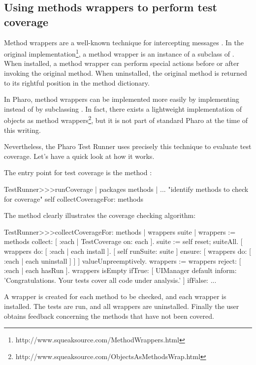 \documentclass[a4paper,10pt,twoside]{book}
\begin{document}
\subsection{Using methods wrappers to perform test coverage}

Method wrappers are a well-known technique for intercepting messages \cite{Bran98a}.
In the original implementation\footnote{http://www.squeaksource.com/MethodWrappers.html}, a method wrapper is an instance of a subclass of . When installed, a method wrapper can perform special actions before or after invoking the original method.
When uninstalled, the original method is returned to its rightful position in the method dictionary.

In Pharo, method wrappers can be implemented more easily by implementing  instead of by subclassing . In fact, there exists a lightweight implementation of objects as method wrappers\footnote{http://www.squeaksource.com/ObjectsAsMethodsWrap.html}, but it is not part of standard Pharo at the time of this writing.

Nevertheless, the Pharo Test Runner uses precisely this technique to evaluate test coverage.
Let's have a quick look at how it works.

The entry point for test coverage is the method :
\begin{code}{}
TestRunner>>>runCoverage
	| packages methods |
	... "identify methods to check for coverage"
	self collectCoverageFor: methods
\end{code}

The method  clearly illustrates the coverage checking algorithm:
\begin{code}{}
TestRunner>>>collectCoverageFor: methods
	| wrappers suite |
	wrappers := methods collect: [ :each | TestCoverage on: each ].
	suite := self
		reset;
		suiteAll.
	[ wrappers do: [ :each | each install ].
	[ self runSuite: suite ] ensure: [ wrappers do: [ :each | each uninstall ] ] ] valueUnpreemptively.
	wrappers := wrappers reject: [ :each | each hasRun ].
	wrappers isEmpty 
		ifTrue: 
			[ UIManager default inform: 'Congratulations. Your tests cover all code under analysis.' ]
		ifFalse: ...
\end{code}
A wrapper is created for each method to be checked, and each wrapper is installed.
The tests are run, and all wrappers are uninstalled.
Finally the user obtains feedback concerning the methods that have not been covered.
\end{document}
